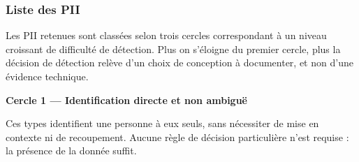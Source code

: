 \documentclass[12pt,a4paper]{article}
\begin{document}
\subsubsection{Liste des PII}

Les PII retenues sont classées selon trois cercles correspondant à un niveau
croissant de difficulté de détection. Plus on s'éloigne du premier cercle,
plus la décision de détection relève d'un choix de conception à documenter,
et non d'une évidence technique.

\medskip
\noindent\textbf{Cercle 1 --- Identification directe et non ambiguë}

\smallskip

Ces types identifient une personne à eux seuls, sans nécessiter de mise en
contexte ni de recoupement. Aucune règle de décision particulière n'est
requise : la présence de la donnée suffit.
\end{document}
